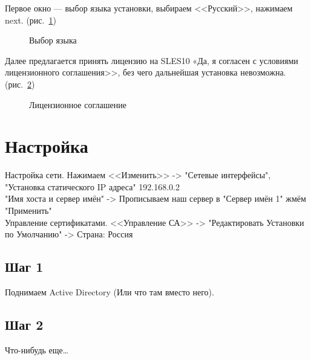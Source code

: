 Первое окно — выбор языка установки, выбираем <<Русский>>, нажимаем next. (рис.~\ref{fig2})
\begin{figure}[H]
\caption{Выбор языка}
\label{fig2}
\end{figure}

Далее предлагается принять лицензию на SLES10 «Да, я согласен с условиями лицензионного соглашения>>, без чего дальнейшая установка невозможна. (рис.~\ref{fig3})
\begin{figure}[H]
\caption{Лицензионное соглашение}
\label{fig3}
\end{figure}

\section{Настройка}
Настройка сети. Нажимаем <<Изменить>> -> "Сетевые интерфейсы", "Установка статического IP адреса" 192.168.0.2\\
"Имя хоста и сервер имён" -> Прописываем наш сервер в "Сервер имён 1" жмём "Применить"\\

Управление сертификатами. <<Управление СА>> -> "Редактировать Установки по Умолчанию" -> Страна: Россия\\


\subsection{Шаг 1}
Поднимаем Active Directory (Или что там вместо него).

\subsection{Шаг 2}
Что-нибудь еще\ldots